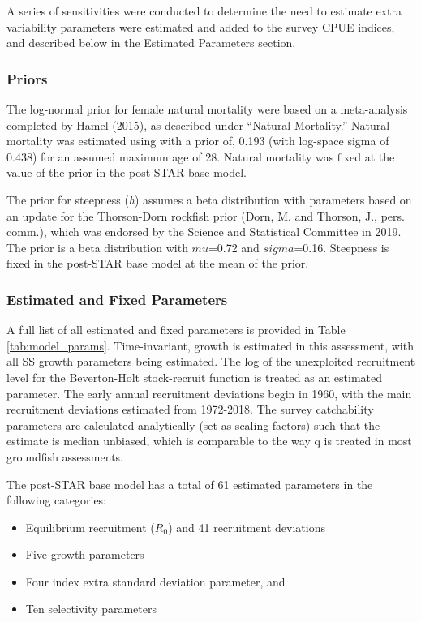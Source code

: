 \documentclass[12pt,]{article}
\begin{document}
A series of sensitivities were conducted to determine the need to
estimate extra variability parameters were estimated and added to the
survey CPUE indices, and described below in the Estimated Parameters
section.

\subsubsection{Priors}\label{priors}

The log-normal prior for female natural mortality were based on a
meta-analysis completed by Hamel
(\protect\hyperlink{ref-Hamel2015}{2015}), as described under ``Natural
Mortality.'' Natural mortality was estimated using with a prior of,
0.193 (with log-space sigma of 0.438) for an assumed maximum age of 28.
Natural mortality was fixed at the value of the prior in the post-STAR
base model.

The prior for steepness (\emph{h}) assumes a beta distribution with
parameters based on an update for the Thorson-Dorn rockfish prior (Dorn,
M. and Thorson, J., pers. comm.), which was endorsed by the Science and
Statistical Committee in 2019. The prior is a beta distribution with
\(mu\)=0.72 and \(sigma\)=0.16. Steepness is fixed in the post-STAR base
model at the mean of the prior.

\subsubsection{Estimated and Fixed
Parameters}\label{estimated-and-fixed-parameters}

A full list of all estimated and fixed parameters is provided in Table
\ref{tab:model_params}. Time-invariant, growth is estimated in this
assessment, with all SS growth parameters being estimated. The log of
the unexploited recruitment level for the Beverton-Holt stock-recruit
function is treated as an estimated parameter. The early annual
recruitment deviations begin in 1960, with the main recruitment
deviations estimated from 1972-2018. The survey catchability parameters
are calculated analytically (set as scaling factors) such that the
estimate is median unbiased, which is comparable to the way q is treated
in most groundfish assessments.

The post-STAR base model has a total of 61 estimated parameters in the
following categories:

\begin{itemize}
  \item Equilibrium recruitment ($R_0$) and 41 recruitment deviations
  \item Five growth parameters
  \item Four index extra standard deviation parameter, and
  \item Ten selectivity parameters
\end{itemize}
\end{document}
